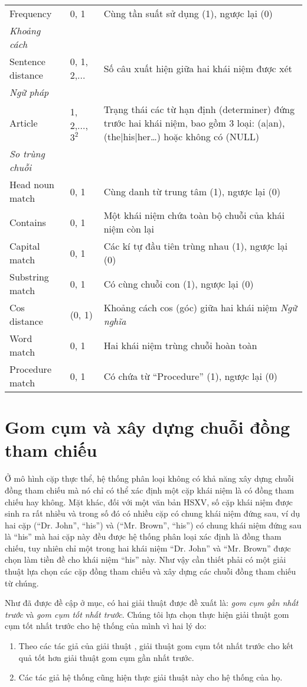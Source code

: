 \begin{table}[th]
\begin{tabularx}{\textwidth}{@{}P{\raggedright}{0.3}lL@{}}
\quad Frequency & 0, 1 & Cùng tần suất sử dụng (1), ngược lại (0)\\
\emph{Khoảng cách}\\
\quad Sentence distance & 0, 1, 2,... & Số câu xuất hiện giữa hai khái niệm được xét\\
\emph{Ngữ pháp}\\
\quad Article & 1, 2,..., $3^{2}$ & Trạng thái các từ hạn định (determiner) đứng trước hai khái niệm, bao gồm 3 loại: (a|an), (the|his|her…) hoặc không có (NULL)\\
\emph{So trùng chuỗi}\\
\quad Head noun match & 0, 1 & Cùng danh từ trung tâm (1), ngược lại (0)\\
\quad Contains & 0, 1 & Một khái niệm chứa toàn bộ chuỗi của khái niệm còn lại\\
\quad Capital match & 0, 1 & Các kí tự đầu tiên trùng nhau (1), ngược lại (0)\\
\quad Substring match & 0, 1 & Có cùng chuỗi con (1), ngược lại (0)\\
\quad Cos distance & (0, 1) & Khoảng cách cos (góc) giữa hai khái niệm
\emph{Ngữ nghĩa}\\
\quad Word match & 0, 1 & Hai khái niệm trùng chuỗi hoàn toàn\\
\quad Procedure match & 0, 1 & Có chứa từ ``Procedure'' (1), ngược lại (0)\\
\bottomrule
\end{tabularx}
\end{table}

\section{Gom cụm và xây dựng chuỗi đồng tham chiếu}
Ở mô hình cặp thực thể, hệ thống phân loại không có khả năng xây dựng chuỗi đồng tham chiếu mà nó chỉ có thể xác định một cặp khái niệm là có đồng tham chiếu hay không. Mặt khác, đối với một văn bản HSXV, số cặp khái niệm được sinh ra rất nhiều và trong số đó có nhiều cặp có chung khái niệm đứng sau, ví dụ hai cặp (“Dr. John”, “his”) và (“Mr. Brown”, “his”) có chung khái niệm đứng sau là “his” mà hai cặp này đều được hệ thống phân loại xác định là đồng tham chiếu, tuy nhiên chỉ một trong hai khái niệm “Dr. John” và “Mr. Brown” được chọn làm tiền đề cho khái niệm “his” này. Như vậy cần thiết phải có một giải thuật lựa chọn các cặp đồng tham chiếu và xây dựng các chuỗi đồng tham chiếu từ chúng.

Như đã được đề cập ở mục, có hai giải thuật được đề xuất là: \emph{gom cụm gần nhất trước} và \emph{gom cụm tốt nhất trước}. Chúng tôi lựa chọn thực hiện giải thuật gom cụm tốt nhất trước cho hệ thống của mình vì hai lý do:
\begin{enumerate}
\item Theo các tác giả của giải thuật \cite{VincentNg2002}, giải thuật gom cụm tốt nhất trước cho kết quả tốt hơn giải thuật gom cụm gần nhất trước.
\item Các tác giả hệ thống \cite{YanXu2012} cũng hiện thực giải thuật này cho hệ thống của họ.
\end{enumerate}

